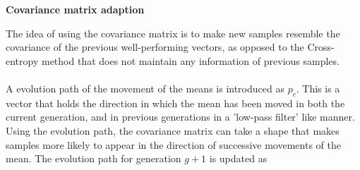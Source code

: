 \textbf{Covariance matrix adaption}

The idea of using the covariance matrix is to make new samples
resemble the covariance of the previous well-performing vectors, as opposed 
to the Cross-entropy method that does not maintain any information of
previous samples.\\
\\
A evolution path of the movement of the means is introduced as $p_{c}$. This 
is a vector that holds the direction in which the mean has been moved in 
both the current generation, and in previous generations in 
a 'low-pass filter' like manner. Using the 
evolution path, the covariance matrix can take a shape that 
makes samples more likely to appear in the direction of successive 
movements of the mean.
The evolution path for generation $g+1$ is updated as



